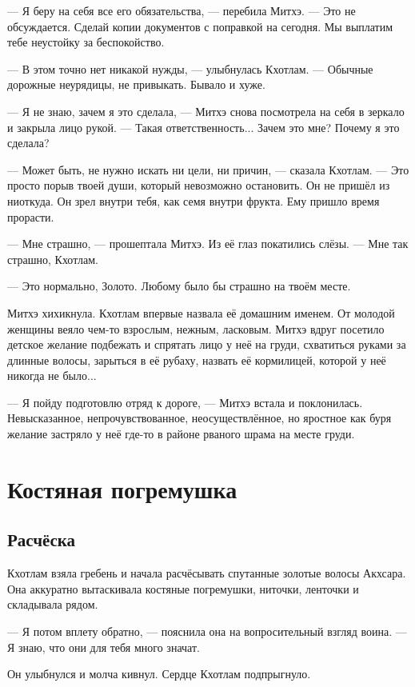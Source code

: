 --- Я беру на себя все его обязательства, --- перебила Митхэ.
--- Это не обсуждается.
Сделай копии документов с поправкой на сегодня.
Мы выплатим тебе неустойку за беспокойство.

--- В этом точно нет никакой нужды, --- улыбнулась Кхотлам.
--- Обычные дорожные неурядицы, не привыкать.
Бывало и хуже.

--- Я не знаю, зачем я это сделала, --- Митхэ снова посмотрела на себя в зеркало и закрыла лицо рукой.
--- Такая ответственность...
Зачем это мне?
Почему я это сделала?

--- Может быть, не нужно искать ни цели, ни причин, --- сказала Кхотлам.
--- Это просто порыв твоей души, который невозможно остановить.
Он не пришёл из ниоткуда.
Он зрел внутри тебя, как семя внутри фрукта.
Ему пришло время прорасти.

--- Мне страшно, --- прошептала Митхэ.
Из её глаз покатились слёзы.
--- Мне так страшно, Кхотлам.

--- Это нормально, Золото.
Любому было бы страшно на твоём месте.

Митхэ хихикнула.
Кхотлам впервые назвала её домашним именем.
От молодой женщины веяло чем-то взрослым, нежным, ласковым.
Митхэ вдруг посетило детское желание подбежать и спрятать лицо у неё на груди, схватиться руками за длинные волосы, зарыться в её рубаху, назвать её кормилицей, которой у неё никогда не было...

--- Я пойду подготовлю отряд к дороге, --- Митхэ встала и поклонилась.
Невысказанное, непрочувствованное, неосуществлённое, но яростное как буря желание застряло у неё где-то в районе рваного шрама на месте груди.

\chapter{Костяная погремушка}

\section{Расчёска}

Кхотлам взяла гребень и начала расчёсывать спутанные золотые волосы Акхсара.
Она аккуратно вытаскивала костяные погремушки, ниточки, ленточки и складывала рядом.

--- Я потом вплету обратно, --- пояснила она на вопросительный взгляд воина.
--- Я знаю, что они для тебя много значат.

Он улыбнулся и молча кивнул.
Сердце Кхотлам подпрыгнуло.

